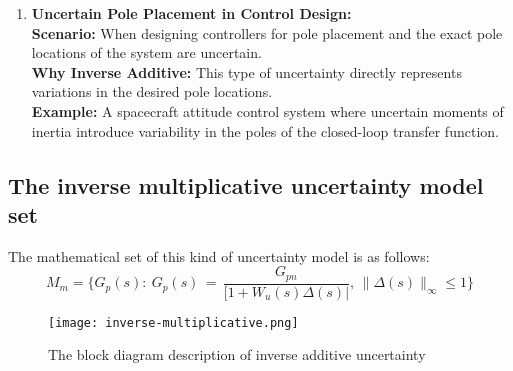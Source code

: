 \begin{enumerate}
    \item \textbf{Uncertain Pole Placement in Control Design:}\\
    \textbf{Scenario:} When designing controllers for pole placement and the exact pole locations of the system are uncertain.\\
    \textbf{Why Inverse Additive:} This type of uncertainty directly represents variations in the desired pole locations.\\
    \textbf{Example:} A spacecraft attitude control system where uncertain moments of inertia introduce variability in the poles of the closed-loop transfer function.
\end{enumerate}



\subsection{The inverse multiplicative uncertainty model set}
The mathematical set of this kind of uncertainty model is as follows:
\[
M_m = \{G_p(s):\:G_p(s)\,=\,\frac{G_{pn}}{[1 + W_u(s)\Delta(s)|},\,\|\Delta(s)\|_\infty\leq 1 \}
\]
\begin{figure}[H]
    \centering
    \texttt{[image: inverse-multiplicative.png]}
    \caption{The block diagram description of inverse additive uncertainty}
\end{figure}

